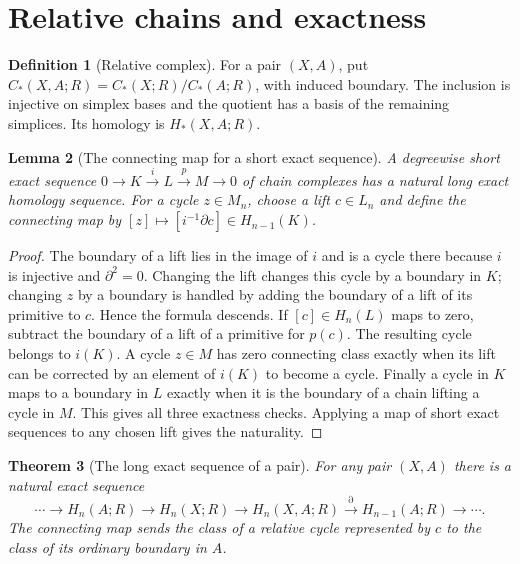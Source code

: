 \documentclass[11pt,oneside,openany]{book}
\theoremstyle{plain}
\newtheorem{theorem}{Theorem}[chapter]
\newtheorem{lemma}[theorem]{Lemma}
\theoremstyle{definition}
\newtheorem{definition}[theorem]{Definition}
\theoremstyle{remark}
\begin{document}
\section{Relative chains and exactness}\label{p202:T16}

\begin{definition}[Relative complex]
For a pair \((X,A)\), put
\(C_*(X,A;R)=C_*(X;R)/C_*(A;R)\), with induced boundary.
The inclusion is injective on simplex bases and the
quotient has a basis of the remaining simplices.
Its homology is \(H_*(X,A;R)\).
\end{definition}

\begin{lemma}[The connecting map for a short exact sequence]
\label{lem:p202-chain-les}
A degreewise short exact sequence
\(0\to K\xrightarrow{i}L\xrightarrow{p}M\to0\)
of chain complexes has a natural long exact homology
sequence. For a cycle \(z\in M_n\), choose a lift
\(c\in L_n\) and define the connecting map by
\([z]\mapsto [i^{-1}\partial c]\in H_{n-1}(K)\).
\end{lemma}

\begin{proof}
The boundary of a lift lies in the image of \(i\)
and is a cycle there because \(i\) is injective and
\(\partial^2=0\). Changing the lift changes this
cycle by a boundary in \(K\); changing \(z\) by a
boundary is handled by adding the boundary of a lift
of its primitive to \(c\). Hence the formula descends.
If \([c]\in H_n(L)\) maps to zero, subtract the
boundary of a lift of a primitive for \(p(c)\).
The resulting cycle belongs to \(i(K)\). A cycle
\(z\in M\) has zero connecting class exactly when
its lift can be corrected by an element of \(i(K)\)
to become a cycle. Finally a cycle in \(K\) maps
to a boundary in \(L\) exactly when it is the boundary
of a chain lifting a cycle in \(M\). This gives all
three exactness checks. Applying a map of short exact
sequences to any chosen lift gives the naturality.
\end{proof}

\begin{theorem}[The long exact sequence of a pair]
\label{thm:p202-relative-les}
For any pair \((X,A)\) there is a natural exact
sequence
\[
 \cdots\longrightarrow H_n(A;R)\longrightarrow H_n(X;R)
 \longrightarrow H_n(X,A;R)
 \xrightarrow{\partial}H_{n-1}(A;R)\longrightarrow\cdots .
\]
The connecting map sends the class of a relative cycle
represented by \(c\) to the class of its ordinary
boundary in \(A\).
\end{theorem}
\end{document}
